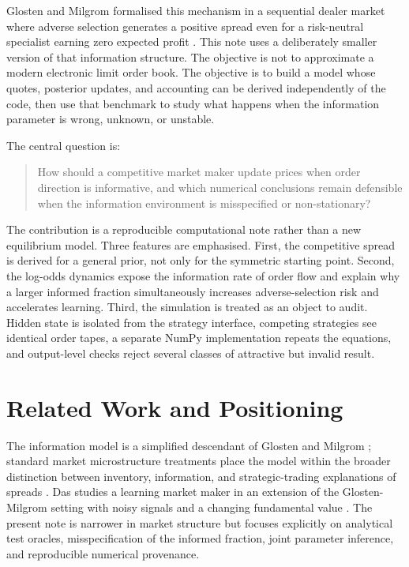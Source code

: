 \documentclass[11pt]{article}
\begin{document}
Glosten and Milgrom formalised this mechanism in a sequential dealer market where adverse selection generates a positive spread even for a risk-neutral specialist earning zero expected profit \cite{glosten_milgrom_1985}. This note uses a deliberately smaller version of that information structure. The objective is not to approximate a modern electronic limit order book. The objective is to build a model whose quotes, posterior updates, and accounting can be derived independently of the code, then use that benchmark to study what happens when the information parameter is wrong, unknown, or unstable.

The central question is:

\begin{quote}
How should a competitive market maker update prices when order direction is informative, and which numerical conclusions remain defensible when the information environment is misspecified or non-stationary?
\end{quote}

The contribution is a reproducible computational note rather than a new equilibrium model. Three features are emphasised. First, the competitive spread is derived for a general prior, not only for the symmetric starting point. Second, the log-odds dynamics expose the information rate of order flow and explain why a larger informed fraction simultaneously increases adverse-selection risk and accelerates learning. Third, the simulation is treated as an object to audit. Hidden state is isolated from the strategy interface, competing strategies see identical order tapes, a separate NumPy implementation repeats the equations, and output-level checks reject several classes of attractive but invalid result.

\section{Related Work and Positioning}

The information model is a simplified descendant of Glosten and Milgrom \cite{glosten_milgrom_1985}; standard market microstructure treatments place the model within the broader distinction between inventory, information, and strategic-trading explanations of spreads \cite{ohara_1995}. Das studies a learning market maker in an extension of the Glosten-Milgrom setting with noisy signals and a changing fundamental value \cite{das_2005}. The present note is narrower in market structure but focuses explicitly on analytical test oracles, misspecification of the informed fraction, joint parameter inference, and reproducible numerical provenance.
\end{document}
